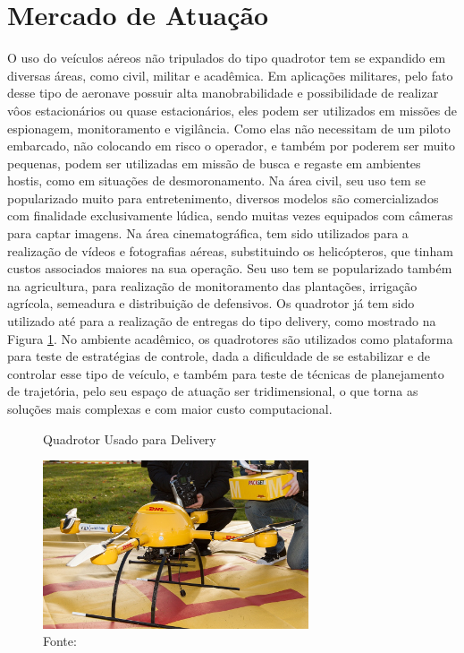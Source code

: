 \section{Mercado de Atuação}

O uso do veículos aéreos não tripulados do tipo quadrotor tem se expandido em diversas áreas, como civil, militar e acadêmica. Em aplicações militares, pelo fato desse tipo de aeronave possuir alta manobrabilidade e possibilidade de realizar vôos estacionários ou quase estacionários, eles podem ser utilizados em missões de espionagem, monitoramento e vigilância. Como elas não necessitam de um piloto embarcado, não colocando em risco o operador, e também por poderem ser muito pequenas, podem ser utilizadas em missão de busca e regaste em ambientes hostis, como em situações de desmoronamento. Na área civil, seu uso tem se popularizado muito para entretenimento, diversos modelos são comercializados com finalidade exclusivamente lúdica, sendo muitas vezes equipados com câmeras para captar imagens. Na área cinematográfica, tem sido utilizados para a realização de vídeos e fotografias aéreas, substituindo os helicópteros, que tinham custos associados maiores na sua operação. Seu uso tem se popularizado também na agricultura, para realização de monitoramento das plantações, irrigação agrícola, semeadura e distribuição de defensivos. Os quadrotor já tem sido utilizado até para a realização de entregas do tipo delivery, como mostrado na Figura \ref{fig:delivery}. No ambiente acadêmico, os quadrotores são utilizados como plataforma para teste de estratégias de controle, dada a dificuldade de se estabilizar e de controlar esse tipo de veículo, e também para teste de técnicas de planejamento de trajetória, pelo seu espaço de atuação ser tridimensional, o que torna as soluções mais complexas e com maior custo computacional.

\begin{figure} [h!]	
  \centering
  {
  \caption{Quadrotor Usado para Delivery}
  \includegraphics[width=0.7\textwidth]{Figures/Package_copter_microdrones_dhl.jpg}
  \caption*{Fonte: \cite{delivery}}
  \label{fig:delivery}
  }
\end{figure}

